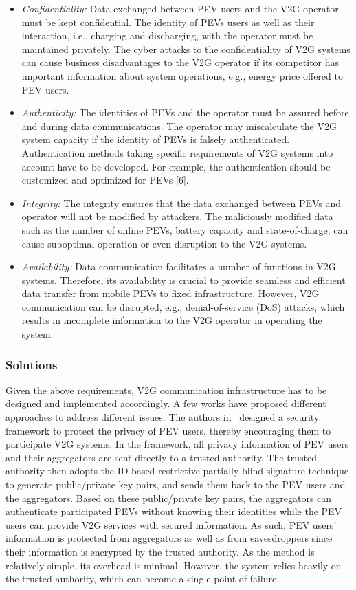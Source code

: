 \documentclass[twocolumn,10pt]{IEEEtran}
\begin{document}
\begin{itemize}
	\item \emph{Confidentiality:} Data exchanged between PEV users and the V2G operator must be kept confidential. The identity of PEVs users as well as their interaction, i.e., charging and discharging, with the operator must be maintained privately. The cyber attacks to the confidentiality of V2G systems can cause business disadvantages to the V2G operator if its competitor has important information about system operations, e.g., energy price offered to PEV users.
	\item \emph{Authenticity:} The identities of PEVs and the operator must be assured before and during data communications. The operator may miscalculate the V2G system capacity if the identity of PEVs is falsely authenticated. Authentication methods taking specific requirements of V2G systems into account have to be developed. For example, the authentication should be customized and optimized for PEVs [6].
	\item \emph{Integrity:} The integrity ensures that the data exchanged between PEVs and operator will not be modified by attackers. The maliciously modified data such as the number of online PEVs, battery capacity and state-of-charge, can cause suboptimal operation or even disruption to the V2G systems.
	\item \emph{Availability:} Data communication facilitates a number of functions in V2G systems. Therefore, its availability is crucial to provide seamless and efficient data transfer from mobile PEVs to fixed infrastructure. However, V2G communication can be disrupted, e.g., denial-of-service (DoS) attacks, which results in incomplete information to the V2G operator in operating the system.
\end{itemize}


\subsubsection{Solutions}

Given the above requirements, V2G communication infrastructure has to be designed and implemented accordingly. A few works have proposed different approaches to address different issues. The authors in~\cite{Yang2011P2} designed a security framework to protect the privacy of PEV users, thereby encouraging them to participate V2G systems. In the framework, all privacy information of PEV users and their aggregators are sent directly to a trusted authority. The trusted authority then adopts the ID-based restrictive partially blind signature technique to generate public/private key pairs, and sends them back to the PEV users and the aggregators. Based on these public/private key pairs, the aggregators can authenticate participated PEVs without knowing their identities while the PEV users can provide V2G services with secured information. As such, PEV users' information is protected from aggregators as well as from eavesdroppers since their information is encrypted by the trusted authority. As the method is relatively simple, its overhead is minimal. However, the system relies heavily on the trusted authority, which can become a single point of failure.
\end{document}
